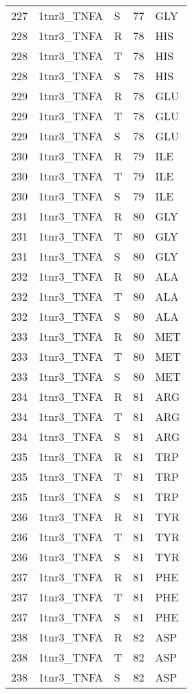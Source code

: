 \begin{tiny}
\begin{longtable}[l]{l|l|l|l|l}
	227 & 1tnr3\_TNFA & S & 77 & GLY \\
	228 & 1tnr3\_TNFA & R & 78 & HIS \\
	228 & 1tnr3\_TNFA & T & 78 & HIS \\
	228 & 1tnr3\_TNFA & S & 78 & HIS \\
	229 & 1tnr3\_TNFA & R & 78 & GLU \\
	229 & 1tnr3\_TNFA & T & 78 & GLU \\
	229 & 1tnr3\_TNFA & S & 78 & GLU \\
	230 & 1tnr3\_TNFA & R & 79 & ILE \\
	230 & 1tnr3\_TNFA & T & 79 & ILE \\
	230 & 1tnr3\_TNFA & S & 79 & ILE \\
	231 & 1tnr3\_TNFA & R & 80 & GLY \\
	231 & 1tnr3\_TNFA & T & 80 & GLY \\
	231 & 1tnr3\_TNFA & S & 80 & GLY \\
	232 & 1tnr3\_TNFA & R & 80 & ALA \\
	232 & 1tnr3\_TNFA & T & 80 & ALA \\
	232 & 1tnr3\_TNFA & S & 80 & ALA \\
	233 & 1tnr3\_TNFA & R & 80 & MET \\
	233 & 1tnr3\_TNFA & T & 80 & MET \\
	233 & 1tnr3\_TNFA & S & 80 & MET \\
	234 & 1tnr3\_TNFA & R & 81 & ARG \\
	234 & 1tnr3\_TNFA & T & 81 & ARG \\
	234 & 1tnr3\_TNFA & S & 81 & ARG \\
	235 & 1tnr3\_TNFA & R & 81 & TRP \\
	235 & 1tnr3\_TNFA & T & 81 & TRP \\
	235 & 1tnr3\_TNFA & S & 81 & TRP \\
	236 & 1tnr3\_TNFA & R & 81 & TYR \\
	236 & 1tnr3\_TNFA & T & 81 & TYR \\
	236 & 1tnr3\_TNFA & S & 81 & TYR \\
	237 & 1tnr3\_TNFA & R & 81 & PHE \\
	237 & 1tnr3\_TNFA & T & 81 & PHE \\
	237 & 1tnr3\_TNFA & S & 81 & PHE \\
	238 & 1tnr3\_TNFA & R & 82 & ASP \\
	238 & 1tnr3\_TNFA & T & 82 & ASP \\
	238 & 1tnr3\_TNFA & S & 82 & ASP \\

\end{longtable}
\end{tiny}
